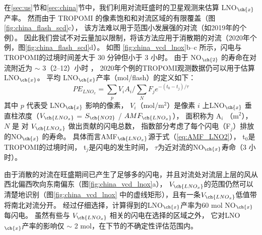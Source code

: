 在\ref{sec:us}节和\ref{sec:china}节中，我们利用对流旺盛时的卫星观测来估算 LNO$_{\ch{x}}$产率。
然而由于 TROPOMI 的像素饱和和对流区域的有限覆盖（图\ref{fig:china_flash_scd}c），
该方法难以用于范围小发展强的对流（如2019年的个例）。
因此我们尝试不对云量加以限制，将该方法应用于消散期的对流（2020年个例，图\ref{fig:china_flash_scd}d）。
如图 \ref{fig:china_vcd_lnox}b--c 所示，闪电与TROPOMI的过境时间差大于 30 分钟但小于 3 小时。
由于 NO$_{\ch{2}}$ 的寿命在对流附近为 $\sim$ 3（2--12）小时 \citep{Nault.2016}，
2020年个例的TROPOMI观测数据仍可以用于估算LNO$_{\ch{x}}$。
平均 LNO$_{\ch{x}}$产率（mol/flash）的定义如下：
\begin{equation} \label{eq:lnox}
PE_{LNO_x} = \sum_{p} V_i A_i / \sum_{N} F_j e^{-(t_0 - t_j) / \tau}
\end{equation}
其中 $p$ 代表受 LNO$_{\ch{x}}$ 影响的像素，
$V_i$（mol/m$^2$）是像素 $i$ 上LNO$_{\ch{x}}$ 垂直柱浓度（$V_{\ch{LNO_x}}$ = $S_{\ch{NO2}}$ / $AMF_{\ch{LNO_x}}$），
面积称为 A$_i$ （m$^2$），
$N$ 是 对 $V_{\ch{LNO_x}}$ 做出贡献的闪电总数，
指数部分考虑了每个闪电（F$_j$）排放的NO$_{\ch{x}}$ 的寿命。
具体而言AMF$_{\ch{LNO_x}}$源于式（\ref{eq:AMF_LNO2}），
t$_0$是TROPOMI的过境时间，
t$_j$是闪电的发生时间，
$\tau$为近对流的NO$_{\ch{x}}$寿命（3 小时）。

由于消散的对流在旺盛期间已产生了足够多的闪电，并且对流处对流层上层的风从西北偏西吹向东南偏东（图\ref{fig:china_vcd_lnox}a），
$V_{\ch{LNO_x}}$的范围仍然可以清楚地识别（图\ref{fig:china_vcd_lnox} 中的虚线矩形），且有一条$V_{\ch{LNO_x}}$低值带将南北对流分开。
经过仔细选择，计算得到的LNO$_{\ch{x}}$产率为60 mol NO$_{\ch{x}}$每闪电。
虽然有些与 $V_{\ch{LNO_x}}$ 相关的闪电在选择的区域之外，
它对LNO$_{\ch{x}}$产率的影响仅 $\sim$ 2 mol，在下节的不确定性评估范围内。




